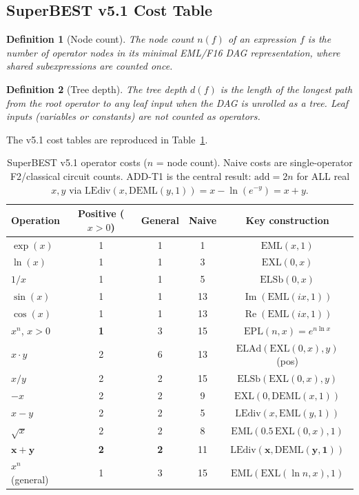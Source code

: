 \documentclass[11pt,a4paper]{article}
\newtheorem{definition}{Definition}[section]
\begin{document}
\subsection{SuperBEST v5.1 Cost Table}

\begin{definition}[Node count]
  The \emph{node count} $n(f)$ of an expression $f$ is the number of operator nodes in
  its minimal EML/F16 DAG representation, where shared subexpressions are counted once.
\end{definition}

\begin{definition}[Tree depth]
  The \emph{tree depth} $d(f)$ is the length of the longest path from the root operator
  to any leaf input when the DAG is unrolled as a tree. Leaf inputs (variables or
  constants) are not counted as operators.
\end{definition}

The v5.1 cost tables are reproduced in Table~\ref{tab:costs}.

\begin{table}[h]
\centering
\caption{SuperBEST v5.1 operator costs ($n$ = node count). Naive costs are single-operator
  F2/classical circuit counts. ADD-T1 is the central result: $\text{add} = 2n$ for ALL
  real $x, y$ via $\mathrm{LEdiv}(x, \mathrm{DEML}(y, 1)) = x - \ln(e^{-y}) = x + y$.}
\label{tab:costs}
\begin{tabular}{lcccc}
\toprule
Operation & Positive ($x{>}0$) & General & Naive & Key construction \\
\midrule
$\exp(x)$     & 1 & 1 & 1  & $\mathrm{EML}(x,1)$ \\
$\ln(x)$      & 1 & 1 & 3  & $\mathrm{EXL}(0,x)$ \\
$1/x$         & 1 & 1 & 5  & $\mathrm{ELSb}(0,x)$ \\
$\sin(x)$     & 1 & 1 & 13 & $\operatorname{Im}(\mathrm{EML}(ix,1))$ \\
$\cos(x)$     & 1 & 1 & 13 & $\operatorname{Re}(\mathrm{EML}(ix,1))$ \\
$x^n$, $x>0$ & \textbf{1} & 3 & 15 & $\mathrm{EPL}(n,x) = e^{n\ln x}$ \\
$x \cdot y$   & 2 & 6 & 13 & $\mathrm{ELAd}(\mathrm{EXL}(0,x),y)$ (pos) \\
$x / y$       & 2 & 2 & 15 & $\mathrm{ELSb}(\mathrm{EXL}(0,x),y)$ \\
$-x$          & 2 & 2 & 9  & $\mathrm{EXL}(0,\mathrm{DEML}(x,1))$ \\
$x - y$       & 2 & 2 & 5  & $\mathrm{LEdiv}(x,\mathrm{EML}(y,1))$ \\
$\sqrt{x}$    & 2 & 2 & 8  & $\mathrm{EML}(0.5\,\mathrm{EXL}(0,x),1)$ \\
$\boldsymbol{x+y}$ & \textbf{2} & \textbf{2} & 11 & $\boldsymbol{\mathrm{LEdiv}(x,\mathrm{DEML}(y,1))}$ \\
$x^n$ (general) & 1 & 3 & 15 & $\mathrm{EML}(\mathrm{EXL}(\ln n,x),1)$ \\
\bottomrule
\end{tabular}
\end{table}
\end{document}
